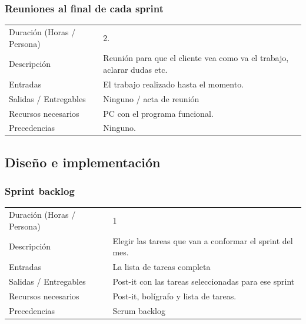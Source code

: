 \subsubsection{Reuniones al final de cada sprint}
\begin{table}[H]
    \begin{center}
        \begin{tabular}{l p{8cm}}
            Duraci\'{o}n (Horas / Persona)        & 2. \\ 
            Descripci\'{o}n                       & Reuni\'{o}n para que el cliente vea como va el trabajo,
                                                    aclarar dudas etc. \\
            Entradas                              & El trabajo realizado hasta el momento.\\
            Salidas / Entregables                 & Ninguno / acta de reuni\'{o}n \\
            Recursos necesarios                   & PC con el programa funcional. \\
            Precedencias                          & Ninguno. \\
        \end{tabular}
    \end{center}
    
\end{table}

\subsection{Dise\~{n}o e implementaci\'{o}n}
\subsubsection{Sprint backlog}
\begin{table}[H]
    \begin{center}
        \begin{tabular}{l p{8cm}}
            Duraci\'{o}n (Horas / Persona)        & 1 \\ 
            Descripci\'{o}n                       & Elegir las tareas que van a conformar el sprint del mes. \\
            Entradas                              & La lista de tareas completa\\
            Salidas / Entregables                 & Post-it con las tareas seleccionadas para ese sprint \\
            Recursos necesarios                   & Post-it, bol\'igrafo y lista de tareas. \\
            Precedencias                          & Scrum backlog \\
        \end{tabular}
    \end{center}
    
\end{table}

